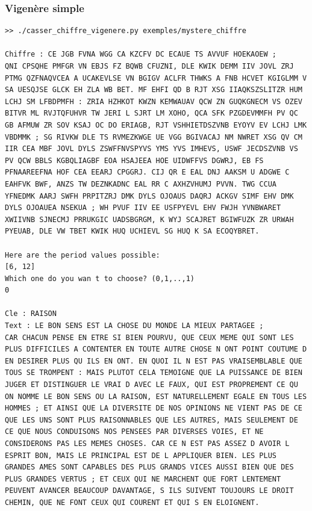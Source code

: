 \documentclass[a4paper, 11pt]{article}
\begin{document}
\subsubsection{Vigenère simple}
\begin{lstlisting}
>> ./casser_chiffre_vigenere.py exemples/mystere_chiffre 

Chiffre : CE JGB FVNA WGG CA KZCFV DC ECAUE TS AVVUF HOEKAOEW ;
QNI CPSQHE PMFGR VN EBJS FZ BQWB CFUZNI, DLE KWIK DEMM IIV JOVL ZRJ
PTMG QZFNAQVCEA A UCAKEVLSE VN BGIGV ACLFR THWKS A FNB HCVET KGIGLMM V
SA UESQJSE GLCK EH ZLA WB BET. MF EHFI QD B RJT XSG IIAQKSZSLITZR HUM
LCHJ SM LFBDPMFH : ZRIA HZHKOT KWZN KEMWAUAV QCW ZN GUQKGNECM VS OZEV
BITVR ML RVJTQFUHVR TW JERI L SJRT LM XOHO, QCA SFK PZGDEVMMFH PV QC
GB AFMUW ZR SOV KSAJ OC DO ERIAGB, RJT VSHHIETDSZVNB EYOYV EV LCHJ LMK
VBDMMK ; SG RIVKW DLE TS RVMEZKWGE UE VGG BGIVACAJ NM NWRET XSG QV CM
IIR CEA MBF JOVL DYLS ZSWFFNVSPYVS YMS YVS IMHEVS, USWF JECDSZVNB VS
PV QCW BBLS KGBQLIAGBF EOA HSAJEEA HOE UIDWFFVS DGWRJ, EB FS
PFNAAREEFNA HOF CEA EEARJ CPGGRJ. CIJ QR E EAL DNJ AAKSM U ADGWE C
EAHFVK BWF, ANZS TW DEZNKADNC EAL RR C AXHZVHUMJ PVVN. TWG CCUA
YFNEDMK AARJ SWFH PRPITZRJ DMK DYLS OJOAUS DAQRJ ACKGV SIMF EHV DMK
DYLS OJOAUEA NSEKUA ; WH PVUF IIV EE USFPYEVL EHV FWJH YVNBWARET
XWIIVNB SJNECMJ PRRUKGIC UADSBGRGM, K WYJ SCAJRET BGIWFUZK ZR URWAH
PYEUAB, DLE VW TBET KWIK HUQ UCHIEVL SG HUQ K SA ECOQYBRET.

Here are the period values possible:
[6, 12]
Which one do you wan t to choose? (0,1,..,1)
0

Cle : RAISON
Text : LE BON SENS EST LA CHOSE DU MONDE LA MIEUX PARTAGEE ;
CAR CHACUN PENSE EN ETRE SI BIEN POURVU, QUE CEUX MEME QUI SONT LES
PLUS DIFFICILES A CONTENTER EN TOUTE AUTRE CHOSE N ONT POINT COUTUME D
EN DESIRER PLUS QU ILS EN ONT. EN QUOI IL N EST PAS VRAISEMBLABLE QUE
TOUS SE TROMPENT : MAIS PLUTOT CELA TEMOIGNE QUE LA PUISSANCE DE BIEN
JUGER ET DISTINGUER LE VRAI D AVEC LE FAUX, QUI EST PROPREMENT CE QU
ON NOMME LE BON SENS OU LA RAISON, EST NATURELLEMENT EGALE EN TOUS LES
HOMMES ; ET AINSI QUE LA DIVERSITE DE NOS OPINIONS NE VIENT PAS DE CE
QUE LES UNS SONT PLUS RAISONNABLES QUE LES AUTRES, MAIS SEULEMENT DE
CE QUE NOUS CONDUISONS NOS PENSEES PAR DIVERSES VOIES, ET NE
CONSIDERONS PAS LES MEMES CHOSES. CAR CE N EST PAS ASSEZ D AVOIR L
ESPRIT BON, MAIS LE PRINCIPAL EST DE L APPLIQUER BIEN. LES PLUS
GRANDES AMES SONT CAPABLES DES PLUS GRANDS VICES AUSSI BIEN QUE DES
PLUS GRANDES VERTUS ; ET CEUX QUI NE MARCHENT QUE FORT LENTEMENT
PEUVENT AVANCER BEAUCOUP DAVANTAGE, S ILS SUIVENT TOUJOURS LE DROIT
CHEMIN, QUE NE FONT CEUX QUI COURENT ET QUI S EN ELOIGNENT.
\end{lstlisting}
\end{document}
